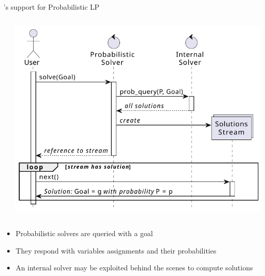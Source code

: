 \documentclass[presentation]{beamer}\mode<presentation>{\usetheme{AMSBolognaFC}}
\begin{document}
\begin{frame}{\twopkt{}'s support for Probabilistic LP}
    \begin{columns}
        \begin{column}{.49\linewidth}
        \end{column}
        \begin{column}{.49\linewidth}
            \includegraphics[width=\linewidth]{figures/general-api.pdf}
        \end{column}
    \end{columns}

    \vfill

    \begin{itemize}\small
        \item Probabilistic solvers are queried with a \alert{goal}
        \vfill
        \item They respond with \alert{variables assignments} and their \alert{probabilities}
        \vfill
        \item An \alert{internal solver} may be exploited behind the scenes to compute solutions
    \end{itemize}
\end{frame}
\end{document}
